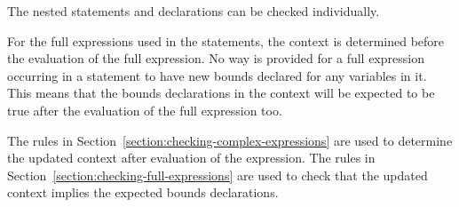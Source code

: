 The nested statements and declarations can be checked individually.

For the full expressions used in the statements, the context is determined
before the evaluation of the full expression. No way is provided for a
full expression occurring in a statement to have new bounds declared 
for any variables in it. This means that the bounds declarations in the
context will be expected to be true after the evaluation of the full expression too.

The rules in Section~\ref{section:checking-complex-expressions}
are used to determine the updated context after evaluation of the
expression. The rules in Section~\ref{section:checking-full-expressions}
are used to check that the updated
context implies the expected bounds declarations.

